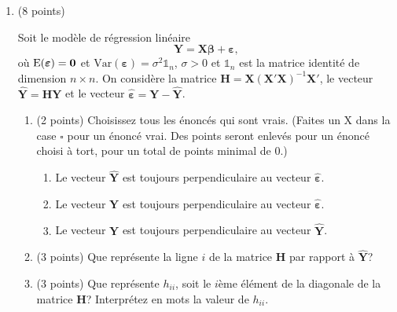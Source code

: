 \documentclass[11pt]{article}
\begin{document}
{\begin{enumerate}
\newpage

\item (8 points)

Soit le mod\`ele de r\'egression lin\'eaire 
$$\boldsymbol{Y} = \boldsymbol{X} \boldsymbol{\beta} + {\boldsymbol{\varepsilon}},$$
o\`u $\mathrm{E}({\boldsymbol{\varepsilon}}) = {\bf 0}$ et $\mathrm{Var}({\boldsymbol{\varepsilon}})=\sigma^2 \mathbb{1}_n $, $\sigma>0$ et $\mathbb{1}_n$ est la
matrice identit\'e de dimension $n\times n$. On considère la matrice $\boldsymbol{H}=\boldsymbol{X}(\boldsymbol{X}'\boldsymbol{X})^{-1}\boldsymbol{X}'$, le vecteur $\widehat{\boldsymbol{Y}}=\boldsymbol{H}\boldsymbol{Y}$ et le vecteur $\widehat{\boldsymbol{\varepsilon}}= \boldsymbol{Y} - \widehat{\boldsymbol{Y}}$.

\begin{enumerate}
	\item (2 points) Choisissez tous les énoncés qui sont vrais. (Faites un X dans la case $\square$ pour un énoncé vrai. Des points seront enlevés pour un énoncé choisi à tort, pour un total de points minimal de 0.)\vspace{0.1in}
	\begin{enumerate}
		\item[$\square$]  Le vecteur $\widehat{\boldsymbol{Y}}$ est toujours perpendiculaire au vecteur $\widehat{\boldsymbol{\varepsilon}}$. \vspace{0.1in}
		\item[$\square$]  Le vecteur $\boldsymbol{Y}$ est toujours perpendiculaire au vecteur $\widehat{\boldsymbol{\varepsilon}}$.\vspace{0.1in}
		\item[$\square$] Le vecteur $\boldsymbol{Y}$ est toujours perpendiculaire au vecteur $\widehat{\boldsymbol{Y}}$.
	\end{enumerate}	 \vspace{0.2in}
	\item (3 points) Que représente la ligne $i$ de la matrice $\boldsymbol{H}$ par rapport à $\widehat{\boldsymbol{Y}}$? 
 \vspace{2in}
	\item (3 points) Que représente $h_{ii}$, soit le $i$ème élément de la diagonale de la matrice $\boldsymbol{H}$? Interprétez en mots la valeur de $h_{ii}$.
 \vspace{2in}
\end{enumerate}

%


\end{enumerate}}
\end{document}
